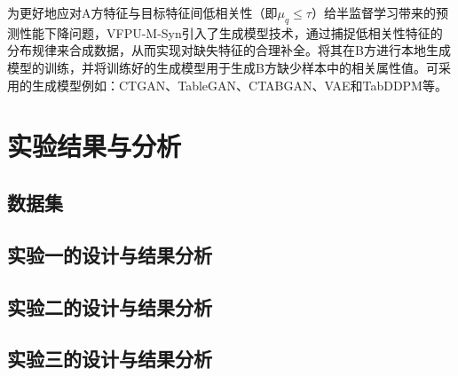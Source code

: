 为更好地应对A方特征与目标特征间低相关性（即$\mu_q \leq \tau$）给半监督学习带来的预测性能下降问题，VFPU-M-Syn引入了生成模型技术，通过捕捉低相关性特征的分布规律来合成数据，从而实现对缺失特征的合理补全。将其在B方进行本地生成模型的训练，并将训练好的生成模型用于生成B方缺少样本中的相关属性值。可采用的生成模型例如：CTGAN、TableGAN、CTABGAN、VAE和TabDDPM等。
\section{实验结果与分析}
\subsection{数据集}
\subsection{实验一的设计与结果分析}
\subsection{实验二的设计与结果分析}
\subsection{实验三的设计与结果分析}